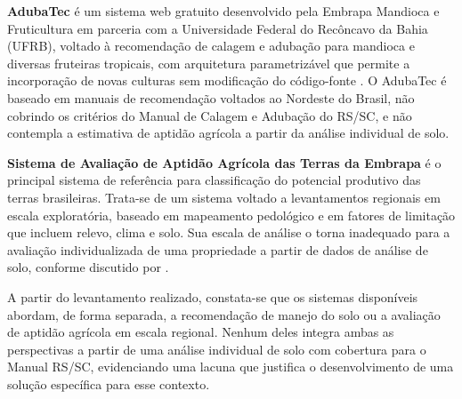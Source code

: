 \textbf{AdubaTec} é um sistema web gratuito desenvolvido pela Embrapa
Mandioca e Fruticultura em parceria com a Universidade Federal do
Recôncavo da Bahia (UFRB), voltado à recomendação de calagem e adubação
para mandioca e diversas fruteiras tropicais, com arquitetura parametrizável
que permite a incorporação de novas culturas sem modificação do código-fonte
\citep{AdubaTec2021}. O AdubaTec é baseado em manuais de recomendação
voltados ao Nordeste do Brasil, não cobrindo os critérios do Manual de
Calagem e Adubação do RS/SC, e não contempla a estimativa de aptidão
agrícola a partir da análise individual de solo.

\textbf{Sistema de Avaliação de Aptidão Agrícola das Terras da Embrapa}
\citep{EmbrapaAptidao2025} é o principal sistema de referência para
classificação do potencial produtivo das terras brasileiras. Trata-se de
um sistema voltado a levantamentos regionais em escala exploratória, baseado
em mapeamento pedológico e em fatores de limitação que incluem relevo,
clima e solo. Sua escala de análise o torna inadequado para a avaliação
individualizada de uma propriedade a partir de dados de análise de solo,
conforme discutido por \cite{Hofig2015}.

A partir do levantamento realizado, constata-se que os sistemas disponíveis
abordam, de forma separada, a recomendação de manejo do solo ou a avaliação
de aptidão agrícola em escala regional. Nenhum deles integra ambas as
perspectivas a partir de uma análise individual de solo com cobertura para
o Manual RS/SC, evidenciando uma lacuna que justifica o desenvolvimento de
uma solução específica para esse contexto.
